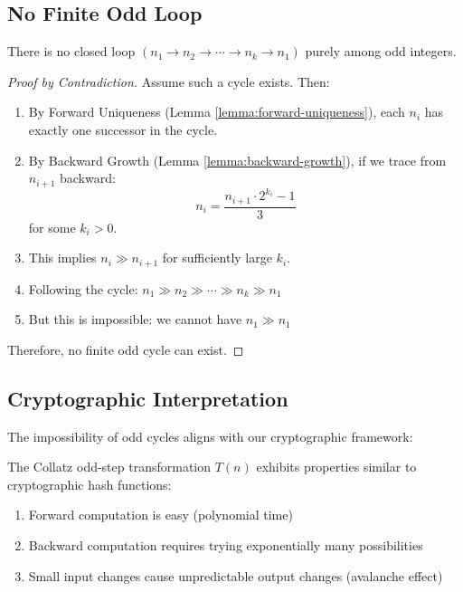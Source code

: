 \subsection{No Finite Odd Loop}

\begin{theorem}
There is no closed loop $(n_1 \to n_2 \to \cdots \to n_k \to n_1)$ purely among odd integers.
\end{theorem}

\begin{proof}[Proof by Contradiction]
Assume such a cycle exists. Then:

\begin{enumerate}
\item By Forward Uniqueness (Lemma \ref{lemma:forward-uniqueness}), each $n_i$ has exactly one successor in the cycle.

\item By Backward Growth (Lemma \ref{lemma:backward-growth}), if we trace from $n_{i+1}$ backward:
\[
n_i = \frac{n_{i+1}\cdot 2^{k_i} - 1}{3}
\]
for some $k_i > 0$.

\item This implies $n_i \gg n_{i+1}$ for sufficiently large $k_i$.

\item Following the cycle: $n_1 \gg n_2 \gg \cdots \gg n_k \gg n_1$

\item But this is impossible: we cannot have $n_1 \gg n_1$
\end{enumerate}

Therefore, no finite odd cycle can exist.
\end{proof}

\subsection{Cryptographic Interpretation}

The impossibility of odd cycles aligns with our cryptographic framework:

\begin{proposition}
The Collatz odd-step transformation $T(n)$ exhibits properties similar to cryptographic hash functions:
\begin{enumerate}
\item Forward computation is easy (polynomial time)
\item Backward computation requires trying exponentially many possibilities
\item Small input changes cause unpredictable output changes (avalanche effect)
\end{enumerate}
\end{proposition}

